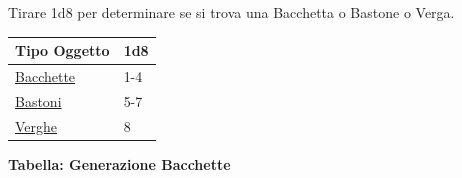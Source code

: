 \begin{multicols}{2}
{Tirare 1d8 per determinare se si trova una Bacchetta o Bastone o Verga.

\medskip

{\small\begin{tabular}{ll}
		\toprule
\textbf{Tipo Oggetto}&\textbf{1d8}\\
\toprule
\hyperlink{Bacchette}{Bacchette}&1-4\\
\hyperlink{Bastoni}{Bastoni}&5-7\\
\hyperlink{Verghe}{Verghe}&8\\
\end{tabular}}

\medskip

\textbf{Tabella: Generazione Bacchette}\hypertarget{Bacchette}{}

\medskip

}
\end{multicols}
